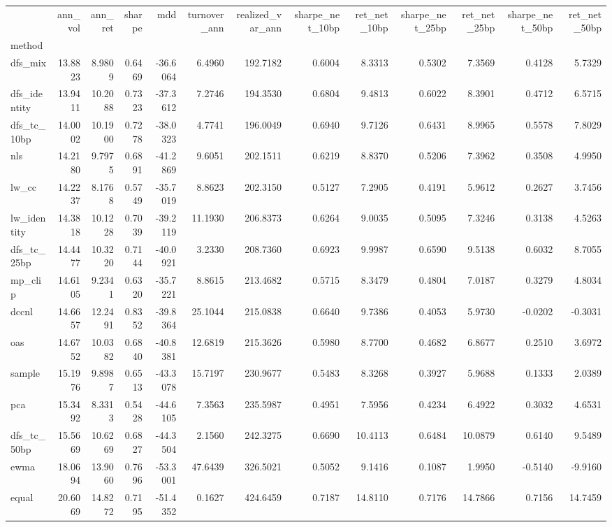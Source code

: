 \begin{tabular}{lrrrrrrrrrrrr}
\toprule
 & ann_vol & ann_ret & sharpe & mdd & turnover_ann & realized_var_ann & sharpe_net_10bp & ret_net_10bp & sharpe_net_25bp & ret_net_25bp & sharpe_net_50bp & ret_net_50bp \\
method &  &  &  &  &  &  &  &  &  &  &  &  \\
\midrule
dfs_mix & 13.8823 & 8.9809 & 0.6469 & -36.6064 & 6.4960 & 192.7182 & 0.6004 & 8.3313 & 0.5302 & 7.3569 & 0.4128 & 5.7329 \\
dfs_identity & 13.9411 & 10.2088 & 0.7323 & -37.3612 & 7.2746 & 194.3530 & 0.6804 & 9.4813 & 0.6022 & 8.3901 & 0.4712 & 6.5715 \\
dfs_tc_10bp & 14.0002 & 10.1900 & 0.7278 & -38.0323 & 4.7741 & 196.0049 & 0.6940 & 9.7126 & 0.6431 & 8.9965 & 0.5578 & 7.8029 \\
nls & 14.2180 & 9.7975 & 0.6891 & -41.2869 & 9.6051 & 202.1511 & 0.6219 & 8.8370 & 0.5206 & 7.3962 & 0.3508 & 4.9950 \\
lw_cc & 14.2237 & 8.1768 & 0.5749 & -35.7019 & 8.8623 & 202.3150 & 0.5127 & 7.2905 & 0.4191 & 5.9612 & 0.2627 & 3.7456 \\
lw_identity & 14.3818 & 10.1228 & 0.7039 & -39.2119 & 11.1930 & 206.8373 & 0.6264 & 9.0035 & 0.5095 & 7.3246 & 0.3138 & 4.5263 \\
dfs_tc_25bp & 14.4477 & 10.3220 & 0.7144 & -40.0921 & 3.2330 & 208.7360 & 0.6923 & 9.9987 & 0.6590 & 9.5138 & 0.6032 & 8.7055 \\
mp_clip & 14.6105 & 9.2341 & 0.6320 & -35.7221 & 8.8615 & 213.4682 & 0.5715 & 8.3479 & 0.4804 & 7.0187 & 0.3279 & 4.8034 \\
dccnl & 14.6657 & 12.2491 & 0.8352 & -39.8364 & 25.1044 & 215.0838 & 0.6640 & 9.7386 & 0.4053 & 5.9730 & -0.0202 & -0.3031 \\
oas & 14.6752 & 10.0382 & 0.6840 & -40.8381 & 12.6819 & 215.3626 & 0.5980 & 8.7700 & 0.4682 & 6.8677 & 0.2510 & 3.6972 \\
sample & 15.1976 & 9.8987 & 0.6513 & -43.3078 & 15.7197 & 230.9677 & 0.5483 & 8.3268 & 0.3927 & 5.9688 & 0.1333 & 2.0389 \\
pca & 15.3492 & 8.3313 & 0.5428 & -44.6105 & 7.3563 & 235.5987 & 0.4951 & 7.5956 & 0.4234 & 6.4922 & 0.3032 & 4.6531 \\
dfs_tc_50bp & 15.5669 & 10.6269 & 0.6827 & -44.3504 & 2.1560 & 242.3275 & 0.6690 & 10.4113 & 0.6484 & 10.0879 & 0.6140 & 9.5489 \\
ewma & 18.0694 & 13.9060 & 0.7696 & -53.3001 & 47.6439 & 326.5021 & 0.5052 & 9.1416 & 0.1087 & 1.9950 & -0.5140 & -9.9160 \\
equal & 20.6069 & 14.8272 & 0.7195 & -51.4352 & 0.1627 & 424.6459 & 0.7187 & 14.8110 & 0.7176 & 14.7866 & 0.7156 & 14.7459 \\
\bottomrule
\end{tabular}
